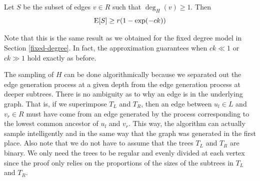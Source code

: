 \begin{thm}
Let $S$ be the subset of edges $v\in R$ such that $\deg_H(v) \geq 1$. Then
\[ \text{E}[S] \geq r(1-\exp(-ck)) \]
\end{thm}

%
%

Note that this is the same result as we obtained for the fixed degree
model in Section \ref{fixed-degree}. In fact, the approximation
guarantees when $ck \ll 1$ or $ck \gg 1$ hold exactly as before.\vs

The sampling of $H$ can be done algorithmically because we separated
out the edge generation process at a given depth from the edge
generation process at deeper subtrees. There is no ambiguity as to why
an edge is in the underlying graph. That is, if we superimpose $T_L$
and $T_R$, then an edge between $u_l\in L$ and $v_r\in R$ must have
come from an edge generated by the process corresponding to the lowest common ancestor of $u_l$ and $v_r$. This way, the algorithm can actually sample intelligently and in the same way that the graph was generated in the first place. Also note
that we do not have to assume that the trees $T_L$ and $T_R$ are
binary. We only need the trees to be regular and evenly divided at
each vertex since the proof only relies on the proportions of the
sizes of the subtrees in $T_L$ and $T_R$.



